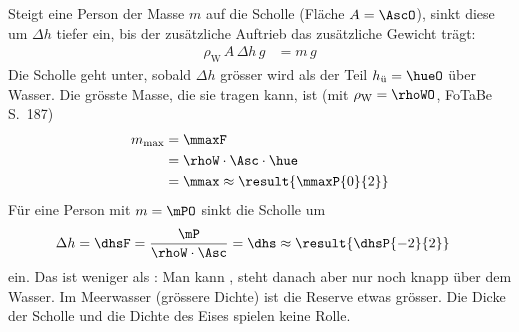 \begin{center}
\end{center}

Steigt eine Person der Masse $m$ auf die Scholle (Fläche $A = \AscO$), sinkt diese um $\Delta h$ tiefer ein, bis der zusätzliche Auftrieb das zusätzliche Gewicht trägt:
\begin{align}
 \rho_\text{W}\,A\,\Delta h\,g &= m\,g
\end{align}
Die Scholle geht unter, sobald $\Delta h$ grösser wird als der Teil $h_\text{ü} = \hueO$ über Wasser. Die grösste Masse, die sie tragen kann, ist (mit $\rho_\text{W} = \rhoWO$, FoTaBe S.~187)
\begin{align}
 m_\text{max} &= \mmaxF \\
   &= \rhoW\cdot\Asc\cdot\hue \\
   &= \mmax \approx \result{\mmaxP{0}{2}}
\end{align}
Für eine Person mit $m = \mPO$ sinkt die Scholle um
\begin{align}
 \Delta h &= \dhsF = \frac{\mP}{\rhoW\cdot\Asc} = \dhs \approx \result{\dhsP{-2}{2}}
\end{align}
ein. Das ist weniger als \hueO: Man kann , steht danach aber nur noch knapp über dem Wasser. Im Meerwasser (grössere Dichte) ist die Reserve etwas grösser. Die Dicke der Scholle und die Dichte des Eises spielen keine Rolle.
